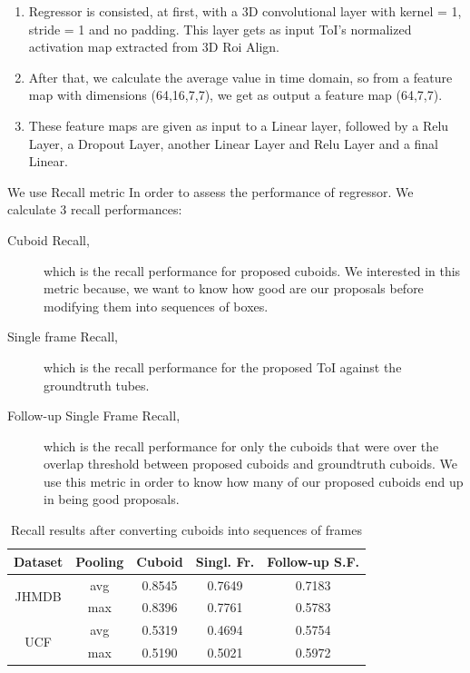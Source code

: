 \begin{enumerate}
\item Regressor is consisted, at first, with a 3D convolutional layer with kernel = 1, stride = 1 and no padding. This layer gets as input ToI's normalized activation map extracted from 3D Roi Align.
\item After that, we calculate the average value in time domain, so from a feature map with dimensions (64,16,7,7), we get as output a feature map (64,7,7).
\item These feature maps are given as input to a Linear layer, followed by a Relu Layer, a Dropout Layer, another Linear Layer and Relu Layer and a final Linear.
\end{enumerate}

We use Recall metric In order to assess the performance of regressor. We calculate 3 recall performances:
\begin{description}
\item [Cuboid Recall,] which is the recall performance for proposed cuboids. We interested in this metric because, we
  want to know how good are our proposals before modifying them into sequences of boxes.

\item [Single frame Recall,] which is the recall performance for the proposed ToI against the groundtruth tubes.
\item[Follow-up Single Frame Recall,] which is the recall performance for only the cuboids that were over the overlap threshold between
  proposed cuboids and groundtruth cuboids. We use this metric in order to know how many of our proposed cuboids end up in being good proposals.
\end{description}

\begin{table}[h]
  \centering
  \begin{tabular} {||c | c || c | c | c ||}
    \hline
    \textbf{Dataset} & \textbf{Pooling} & \textbf{Cuboid} & \textbf{Singl. Fr. } &  \textbf{Follow-up S.F.}\\
    \hline                
    \multirow{2}{*}{JHMDB} & avg & 0.8545 & 0.7649 & 0.7183 \\
    \cline{2-5}
    {} & max & 0.8396 & 0.7761 & 0.5783 \\
    \cline{1-5}
    \multirow{2}{*}{UCF} & avg & 0.5319 & 0.4694 & 0.5754 \\
    \cline{2-5}
    {} & max & 0.5190 & 0.5021 & 0.5972 \\
    \cline{1-5}
                                   
  \end{tabular}
  \caption{Recall results after converting cuboids into sequences of frames}
  \label{table:reg_1_1}
\end{table}

